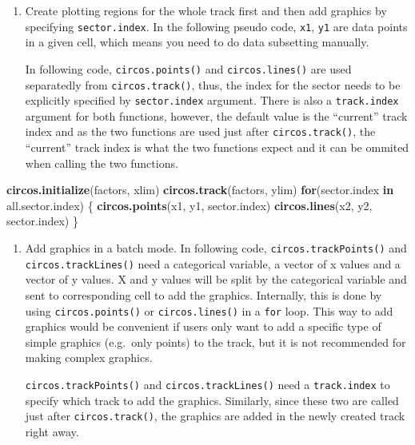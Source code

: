 \documentclass[]{book}
\newenvironment{Shaded}{\begin{snugshade}}{\end{snugshade}}
\newcommand{\KeywordTok}[1]{\textcolor[rgb]{0.13,0.29,0.53}{\textbf{#1}}}
\newcommand{\ControlFlowTok}[1]{\textcolor[rgb]{0.13,0.29,0.53}{\textbf{#1}}}
\newcommand{\NormalTok}[1]{#1}
\begin{document}
\begin{enumerate}
\def\labelenumi{\arabic{enumi}.}
\item
  Create plotting regions for the whole track first and then add
  graphics by specifying \texttt{sector.index}. In the following pseudo
  code, \texttt{x1}, \texttt{y1} are data points in a given cell, which
  means you need to do data subsetting manually.

  In following code, \texttt{circos.points()} and
  \texttt{circos.lines()} are used separatedly from
  \texttt{circos.track()}, thus, the index for the sector needs to be
  explicitly specified by \texttt{sector.index} argument. There is also
  a \texttt{track.index} argument for both functions, however, the
  default value is the ``current'' track index and as the two functions
  are used just after \texttt{circos.track()}, the ``current'' track
  index is what the two functions expect and it can be ommited when
  calling the two functions.
\end{enumerate}

\begin{Shaded}
\begin{Highlighting}[]
\KeywordTok{circos.initialize}\NormalTok{(factors, xlim)}
\KeywordTok{circos.track}\NormalTok{(factors, ylim)}
\ControlFlowTok{for}\NormalTok{(sector.index }\ControlFlowTok{in}\NormalTok{ all.sector.index) \{}
    \KeywordTok{circos.points}\NormalTok{(x1, y1, sector.index)}
    \KeywordTok{circos.lines}\NormalTok{(x2, y2, sector.index)}
\NormalTok{\}}
\end{Highlighting}
\end{Shaded}

\begin{enumerate}
\def\labelenumi{\arabic{enumi}.}
\setcounter{enumi}{1}
\item
  Add graphics in a batch mode. In following code,
  \texttt{circos.trackPoints()} and \texttt{circos.trackLines()} need a
  categorical variable, a vector of x values and a vector of y values. X
  and y values will be split by the categorical variable and sent to
  corresponding cell to add the graphics. Internally, this is done by
  using \texttt{circos.points()} or \texttt{circos.lines()} in a
  \texttt{for} loop. This way to add graphics would be convenient if
  users only want to add a specific type of simple graphics (e.g.~only
  points) to the track, but it is not recommended for making complex
  graphics.

  \texttt{circos.trackPoints()} and \texttt{circos.trackLines()} need a
  \texttt{track.index} to specify which track to add the graphics.
  Similarly, since these two are called just after
  \texttt{circos.track()}, the graphics are added in the newly created
  track right away.
\end{enumerate}
\end{document}
